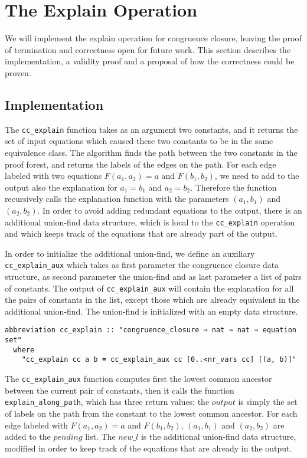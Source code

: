 \section{The Explain Operation}

We will implement the explain operation for congruence closure, leaving the proof of termination and correctness open for future work.  This section describes the implementation, a validity proof and a proposal of how the correctness could be proven.


\subsection{Implementation}

The \lstinline{cc_explain} function takes as an argument two constants, and it returns the set of input equations which caused these two constants to be in the same equivalence class. The algorithm finds the path between the two constants in the proof forest, and returns the labels of the edges on the path. For each edge labeled with two equations $F(a_1, a_2) = a$ and $F(b_1, b_2)$, we need to add to the output also the explanation for $a_1 = b_1$ and $a_2 = b_2$. Therefore the function recursively calls the explanation function with the parameters $(a_1, b_1)$ and $(a_2, b_2)$. In order to avoid adding redundant equations to the output, there is an additional union-find data structure, which is local to the \lstinline{cc_explain} operation and which keeps track of the equations that are already part of the output.

In order to initialize the additional union-find, we define an auxiliary \lstinline{cc_explain_aux} which takes as first parameter the congruence closure data structure, as second parameter the union-find and as last parameter a list of pairs of constants. The output of \lstinline{cc_explain_aux} will contain the explanation for all the pairs of constants in the list, except those which are already equivalent in the additional union-find. The union-find is initialized with an empty data structure.

\begin{lstlisting}
abbreviation cc_explain :: "congruence_closure ⇒ nat ⇒ nat ⇒ equation set"
  where
    "cc_explain cc a b ≡ cc_explain_aux cc [0..<nr_vars cc] [(a, b)]"
\end{lstlisting}

The \lstinline{cc_explain_aux} function computes first the lowest common ancestor between the current pair of constants, then it calls the function \lstinline{explain_along_path}, which has three return values: the $output$ is simply the set of labels on the path from the constant to the lowest common ancestor. For each edge labeled with $F(a_1, a_2) = a$ and $F(b_1, b_2)$,  $(a_1, b_1)$ and $(a_2, b_2)$ are added to the $pending$ list. The $new\_l$ is the additional union-find data structure, modified in order to keep track of the equations that are already in the output.

